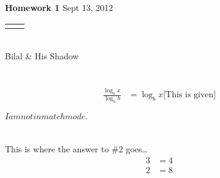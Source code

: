 \documentclass[12pt]{article}
\renewcommand{\title}[1]{\textbf{#1}}
\renewcommand{\line}{\begin{tabularx}{\textwidth}{X>{\raggedleft}X}\hline\\\end{tabularx}\\[-0.5cm]}
\begin{document}
\title{Homework 1}
\hfill Sept 13, 2012
\line
Bilal \& His Shadow


\section{}
\begin{align}
	\frac{\log_{a}{x}}{\log_{a}{b}} &= \log_{b}{x}\mbox{[This is given]}
\end{align}

$I am not in match mode.$
\section{}
This is where the answer to \#2 goes\ldots
	\begin{align}
		3 &= 4 \\
		2 &= 8
	\end{align}
\end{document}
